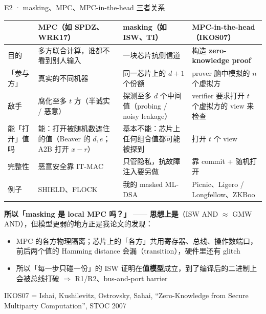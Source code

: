\documentclass[aspectratio=169,10pt,fontset=none]{ctexbeamer}
\newcommand{\src}[1]{{\scriptsize\color{gray}#1}}
\begin{document}
\begin{frame}{E2 · masking、MPC、MPC-in-the-head 三者关系}
{\scriptsize\renewcommand{\arraystretch}{1.2}
\begin{tabularx}{\textwidth}{@{}p{2.2cm}YYY@{}}\toprule
 & \textbf{MPC}（如 SPDZ、WRK17）& \textbf{masking}（如 ISW、TI）& \textbf{MPC-in-the-head}（IKOS07）\\\midrule
目的 & 多方联合计算，谁都不看到别人输入 & 一块芯片抗侧信道 & 构造 \textbf{zero-knowledge proof} \\
「参与方」 & 真实的不同机器 & 同一芯片上的 $d+1$ 个份额 & prover 脑中模拟的 $n$ 个虚拟方 \\
敌手 & 腐化至多 $t$ 方（半诚实 / 恶意）& 探测至多 $d$ 个中间值（probing / noisy leakage）& verifier 要求打开 $t$ 个虚拟方的 view 来检查 \\
能「打开」值吗 & 能：打开被随机数遮住的值（Beaver 的 $d,e$；A2B 打开 $x-r$）& 基本不能：芯片上任何组合值都可能被探到 & 打开 $t$ 个 view \\
完整性 & 恶意安全靠 IT-MAC & 只管隐私，抗故障注入要另做 & 靠 commit + 随机打开 \\
例子 & SHIELD、FLOCK & 我的 masked ML-DSA & Picnic、Ligero / Longfellow、ZKBoo \\\bottomrule
\end{tabularx}}
\vspace{.4em}

\textbf{所以「masking 是 local MPC 吗？」} —— \textbf{思想上是}（ISW AND $\approx$ GMW AND），但模型更弱的地方正是我论文的发现：
\begin{itemize}
  \item MPC 的各方物理隔离；芯片上的「各方」\alert{共用寄存器、总线、操作数端口}，前后两个值的 Hamming distance 会漏（transition），硬件里还有 glitch
  \item 所以「每一步只碰一份」的 ISW 证明在\textbf{值模型}成立，到了编译后的二进制上会被总线打破 $\Rightarrow$ R1/R2、bus-and-port barrier
\end{itemize}
\src{IKOS07 = Ishai, Kushilevitz, Ostrovsky, Sahai, ``Zero-Knowledge from Secure Multiparty Computation'', STOC 2007}
\end{frame}
\end{document}
